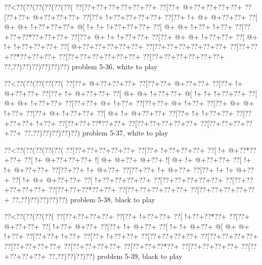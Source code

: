 \vbox{\vbox{\goo
\0??<\0??(\0??(\0??(\0??(\0??(\0??(
\0??[\0??+\0??+\0??+\0??+\0??+\0??+
\0??[\0??+\- @+\0??+\0??+\0??+\0??+
\0??[\0??+\0??+\- @+\0??+\0??+\0??+
\0??[\0??+\- !+\0??+\0??+\0??+\0??+
\0??[\0??+\- !+\- @+\- @+\0??+\0??+
\0??[\- @+\- @+\- !+\0??+\0??+\0??+
\- @[\- !+\- !+\- !+\0??+\0??+\0??+
\0??[\- @+\- @+\- !+\0??+\- !+\0??+
\0??[\0??+\0??+\0??*\0??+\0??+\0??+
\0??[\0??+\- @+\- !+\- !+\0??+\0??+
\0??[\0??+\- @+\- @+\- !+\0??+\0??+
\0??[\- @+\- !+\- !+\0??+\0??+\0??+
\0??[\- @+\0??+\0??+\0??+\0??+\0??+
\0??[\0??+\0??+\0??+\0??+\0??+\0??+
\0??[\0??+\0??+\0??*\0??+\0??+\0??+
\0??[\0??+\0??+\0??+\0??+\0??+\0??+
\0??[\0??+\0??+\0??+\0??+\0??+\0??+
\0??,\0??)\0??)\0??)\0??)\0??)\0??)
}
\hfil problem 5-36, white to play\hfil\break
}

\vbox{\vbox{\goo
\0??<\0??(\0??(\0??(\0??(\0??(
\0??[\0??+\- @+\0??+\0??+\0??+
\0??[\0??+\0??+\- @+\0??+\0??+
\0??[\0??+\- !+\- @+\0??+\0??+
\0??[\0??+\- !+\- @+\0??+\0??+
\0??[\- @+\- @+\- !+\0??+\0??+
\- @[\- !+\- !+\- !+\0??+\0??+
\0??[\- @+\- @+\- !+\0??+\0??+
\0??[\0??+\0??+\- @+\- !+\0??+
\0??[\0??+\0??+\- @+\- !+\0??+
\0??[\0??+\- @+\- @+\- !+\0??+
\0??[\0??+\- @+\- !+\0??+\0??+
\0??[\- @+\- !+\- @+\0??+\0??+
\0??[\0??+\- !+\- !+\0??+\0??+
\0??[\0??+\0??+\0??+\- !+\0??+
\0??[\0??+\0??+\0??*\0??+\0??+
\0??[\0??+\0??+\0??+\0??+\0??+
\0??[\0??+\0??+\0??+\0??+\0??+
\0??,\0??)\0??)\0??)\0??)\0??)
}
\hfil problem 5-37, white to play\hfil\break
}

\vbox{\vbox{\goo
\0??<\0??(\0??(\0??(\0??(\0??(
\0??[\0??+\0??+\0??+\0??+\0??+
\0??[\0??+\- !+\0??+\0??+\0??+
\0??[\- !+\- @+\0??*\0??+\0??+
\0??[\- !+\- @+\0??+\0??+\0??+
\- ![\- @+\- @+\0??+\- @+\0??+
\- ![\- @+\- !+\- @+\0??+\0??+
\0??[\- !+\- !+\- @+\0??+\0??+
\0??[\0??+\0??+\- !+\- @+\0??+
\0??[\0??+\0??+\- !+\- @+\0??+
\0??[\0??+\- !+\- !+\- @+\0??+
\0??[\- !+\- @+\- @+\0??+\0??+
\0??[\- !+\0??+\0??+\0??+\0??+
\0??[\0??+\0??+\0??+\0??+\0??+
\0??[\0??+\0??+\0??+\0??+\0??+
\0??[\0??+\0??+\0??*\0??+\0??+
\0??[\0??+\0??+\0??+\0??+\0??+
\0??[\0??+\0??+\0??+\0??+\0??+
\0??,\0??)\0??)\0??)\0??)\0??)
}
\hfil problem 5-38, black to play\hfil\break
}

\vbox{\vbox{\goo
\0??<\0??(\0??(\0??(\0??(
\0??[\0??+\0??+\0??+\0??+
\0??[\0??+\- !+\0??+\0??+
\0??[\- !+\0??+\0??*\0??+
\0??[\0??+\- @+\0??+\0??+
\0??[\- !+\0??+\- @+\0??+
\0??[\0??+\- !+\- @+\0??+
\0??[\- !+\- !+\- @+\0??+
\- @[\- @+\- @+\- !+\0??+
\0??[\0??+\0??+\- !+\0??+
\0??[\0??+\- !+\0??+\0??+
\0??[\0??+\0??+\0??+\0??+
\0??[\0??+\0??+\0??+\0??+
\0??[\0??+\0??+\0??+\0??+
\0??[\0??+\0??+\0??+\0??+
\0??[\0??+\0??+\0??*\0??+
\0??[\0??+\0??+\0??+\0??+
\0??[\0??+\0??+\0??+\0??+
\0??,\0??)\0??)\0??)\0??)
}
\hfil problem 5-39, black to play\hfil\break
}

